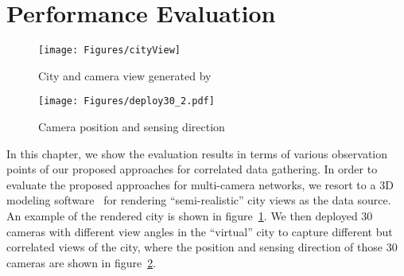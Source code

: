 \section{Performance Evaluation}
\label{sec::evaluation}
%
\begin{figure}
\begin{center}
\texttt{[image: Figures/cityView]}
\caption{\label{fig::cityView}City and camera view generated by~\cite{Suicidator,Blender}}
\end{center}
\end{figure}
%
\begin{figure}
\begin{center}
\texttt{[image: Figures/deploy30\_2.pdf]}
\caption{\label{fig::deploy30}Camera position and sensing direction}
\end{center}
\end{figure}
%
In this chapter, we show the evaluation results in terms of various observation points of our proposed approaches for correlated data gathering.
In order to evaluate the proposed approaches for multi-camera networks, we resort to a 3D modeling software~\cite{Suicidator,Blender} for rendering ``semi-realistic'' city views as the data source.
An example of the rendered city is shown in figure~\ref{fig::cityView}.
We then deployed $30$ cameras with different view angles in the ``virtual'' city to capture different but correlated views of the city, where the position and sensing direction of those $30$ cameras are shown in figure~\ref{fig::deploy30}.

